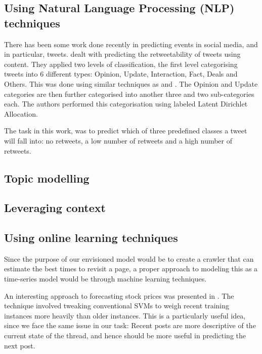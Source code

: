 \subsection{Using Natural Language Processing (NLP) techniques}
There has been some work done recently in predicting events in social media, and 
in particular, tweets.   dealt with predicting the retweetability 
of tweets using content. They applied two levels of classification, the first 
level categorising tweets into 6 different types: Opinion, Update, Interaction, 
Fact, Deals and Others. This was done using similar techniques as 
 and . The Opinion and Update categories 
are then further categorised into another three and two sub-categories each. The 
authors performed this categorisation using labeled Latent Dirichlet Allocation.

The task in this work, was to predict which of three predefined classes a tweet 
will fall into: no retweets, a low number of retweets and a high number of retweets. 

\subsection{Topic modelling}
\cite{Gonzalez2005,Hsu2006}

\subsection{Leveraging context}


\subsection{Using online learning techniques}
Since the purpose of our envisioned model would be to create a crawler that can 
estimate the best times to revisit a page, a proper approach to modeling this as 
a time-series model would be through machine learning techniques.

An interesting approach to forecasting stock prices was presented in 
. The technique involved tweaking conventional SVMs to weigh 
recent training instances more heavily than older instances. This is a 
particularly useful idea, since we face the same issue in our task: Recent posts 
are more descriptive of the current state of the thread, and hence should be 
more useful in predicting the next post.
